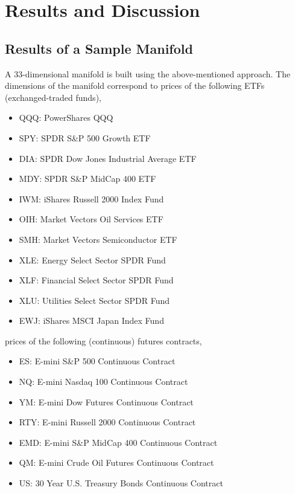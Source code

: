 \documentclass{article}
\begin{document}
\section{Results and Discussion}\label{section:results-discussion}

\subsection{Results of a Sample Manifold}\label{subsection:some-results}

A 33-dimensional manifold is built using the above-mentioned
approach. The dimensions of the manifold correspond to prices of the
following ETFs (exchanged-traded funds),

\begin{itemize}
    \item[] QQQ: PowerShares QQQ 
    \item[] SPY: SPDR S\&P 500 Growth ETF 
    \item[] DIA: SPDR Dow Jones Industrial Average ETF 
    \item[] MDY: SPDR S\&P MidCap 400 ETF 
    \item[] IWM: iShares Russell 2000 Index Fund 
    \item[] OIH: Market Vectors Oil Services ETF 
    \item[] SMH: Market Vectors Semiconductor ETF 
    \item[] XLE: Energy Select Sector SPDR Fund 
    \item[] XLF: Financial Select Sector SPDR Fund 
    \item[] XLU: Utilities Select Sector SPDR Fund 
    \item[] EWJ: iShares MSCI Japan Index Fund
\end{itemize}

prices of the following (continuous) futures contracts,

\begin{itemize}
    \item[] ES:  E-mini S\&P 500 Continuous Contract 
    \item[] NQ:  E-mini Nasdaq 100 Continuous Contract 
    \item[] YM:  E-mini Dow Futures Continuous Contract 
    \item[] RTY: E-mini Russell 2000 Continuous Contract 
    \item[] EMD: E-mini S\&P MidCap 400 Continuous Contract 
    \item[] QM:  E-mini Crude Oil Futures Continuous Contract 
    \item[] US:  30 Year U.S. Treasury Bonds Continuous Contract    
\end{itemize}
\end{document}
